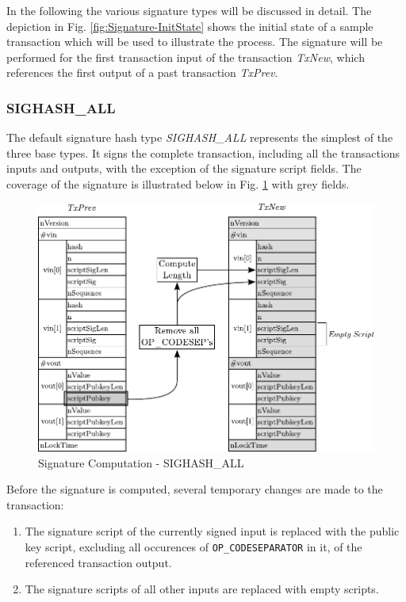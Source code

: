 \noindent
In the following the various signature types will be discussed in detail. The depiction in Fig. \ref{fig:Signature-InitState} shows the initial state of a sample transaction which will be used to illustrate the process. The signature will be performed for the first transaction input of the transaction \emph{TxNew}, which references the first output of a past transaction \emph{TxPrev}.


\subsubsection*{SIGHASH\_ALL}
The default signature hash type \emph{SIGHASH\_ALL} represents the simplest of the three base types. It signs the complete transaction, including all the transactions inputs and outputs, with the exception of the signature script fields. The coverage of the signature is illustrated below in Fig. \ref{fig:SigHash-All} with grey fields.

\begin{figure}[ht!]
 \centering
 \includegraphics[scale=0.9]{images/SIGHASH_ALL.pdf}
 \caption{Signature Computation - SIGHASH\_ALL} \label{fig:SigHash-All}
\end{figure}

\noindent
Before the signature is computed, several temporary changes are made to the transaction:
\begin{enumerate}[label=\alph*), leftmargin=1cm]
\item The signature script of the currently signed input is replaced with the public key script, excluding all occurences of \texttt{OP\_CODESEPARATOR} in it, of the referenced transaction output.
\item The signature scripts of all other inputs are replaced with empty scripts.
\end{enumerate}


